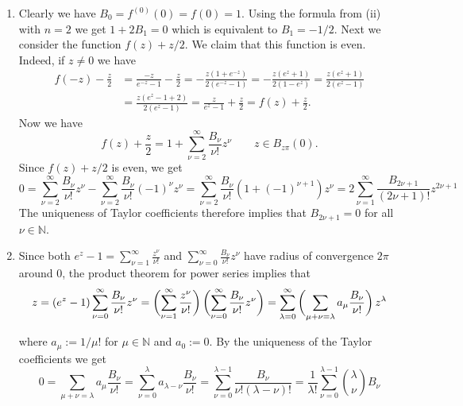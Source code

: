 \begin{enumerate}[label = \textbf{Exercise \arabic*.},wide = 0pt, itemsep=1.5ex]
		\begin{enumerate}[label = (\roman*),wide = 0pt, itemsep=1.5ex]
			\item Clearly we have $B_0 = f^{(0)}(0) = f(0) = 1$. Using the formula from (ii) with $n = 2$ we get $1 + 2B_1 = 0$ which is equivalent to $B_1 = -1/2$. Next we consider the function $f(z) + z/2$. We claim that this function is even. Indeed, if $z \neq 0$ we have 
				\begin{align*}
					f(-z) - \frac{z}{2} &= \frac{-z}{e^{-z} - 1} - \frac{z}{2} = -\frac{z(1 + e^{-z})}{2(e^{-z} - 1)} = -\frac{z(e^z + 1)}{2(1 - e^z)}= \frac{z(e^z + 1)}{2(e^z - 1)}\\
					&= \frac{z(e^z - 1 + 2)}{2(e^z - 1)}= \frac{z}{e^z - 1} + \frac{z}{2}= f(z) + \frac{z}{2}.
				\end{align*}
			Now we have 
			\begin{equation}
				f(z) + \frac{z}{2} = 1 + \sum_{\nu = 2}^\infty \frac{B_\nu}{\nu !} z^\nu \qquad z \in B_{z\pi}(0).
			\end{equation}
			Since $f(z) + z/2$ is even, we get
			\begin{equation}
				0 = \sum_{\nu = 2}^\infty \frac{B_\nu}{\nu !} z^\nu - \sum_{\nu = 2}^\infty \frac{B_\nu}{\nu !} (-1)^\nu z^\nu = \sum_{\nu = 2}^\infty \frac{B_\nu}{\nu !} (1 + (-1)^{\nu+1})z^\nu = 2\sum_{\nu = 1}^\infty \frac{B_{2\nu + 1}}{(2\nu + 1)!}z^{2\nu + 1}
			\end{equation}
			The uniqueness of Taylor coefficients therefore implies that $B_{2\nu + 1} = 0$ for all $\nu \in \mathbb{N}$.
		\item Since both $e^z - 1 = \sum_{\nu = 1}^\infty\frac{z^\nu}{\nu!}$ and $\sum_{\nu = 0}^\infty\frac{B_\nu}{\nu!}z^\nu$ have radius of convergence $2\pi$ around $0$, the product theorem for power series \cite[195]{remmert2002funktionentheorie} implies that 
			\begin{equation}
				z = (e^z - 1)\sum_{\nu = 0}^\infty \frac{B_\nu}{\nu !}z^\nu= \del[3]{\sum_{\nu = 1}^\infty \frac{z^\nu}{\nu!}} \del[3]{\sum_{\nu = 0}^\infty \frac{B_\nu}{\nu!}z^\nu}= \sum_{\lambda = 0}^\infty \del[3]{\sum_{\mu + \nu = \lambda}a_\mu \frac{B_\nu}{\nu !}}z^\lambda
			\end{equation}

			\noindent where $a_\mu := 1/\mu!$ for $\mu \in \mathbb{N}$ and $a_0 := 0$. By the uniqueness of the Taylor coefficients we get
			\begin{equation}
				0 = \sum_{\mu + \nu = \lambda}a_\mu\frac{B_\nu}{\nu!} = \sum_{\nu = 0}^\lambda a_{\lambda - \nu}\frac{B_\nu}{\nu!} = \sum_{\nu = 0}^{\lambda - 1} \frac{B_\nu}{\nu!(\lambda - \nu)!} = \frac{1}{\lambda !}\sum_{\nu = 0}^{\lambda - 1}{\lambda \choose \nu}B_\nu
			\end{equation}


\end{enumerate}
\end{enumerate}
